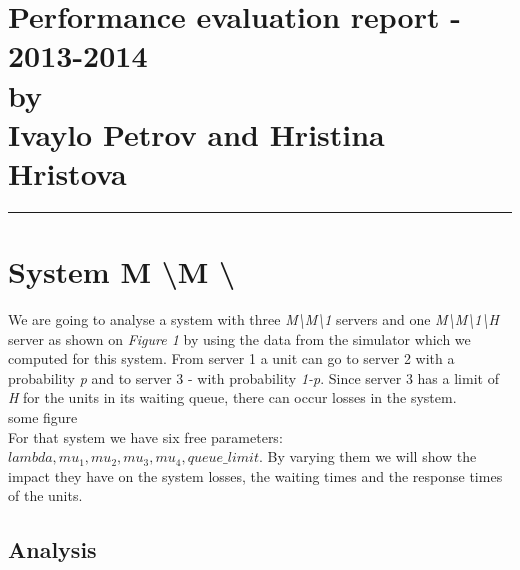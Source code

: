 \documentclass[12pt]{article}
\newcommand{\hr}{\rule{\linewidth}{0.1mm}}
\theoremstyle{plain}
\begin{document}
\section*{\centering
  Performance evaluation report - 2013-2014 \\
  by\\
  Ivaylo Petrov and Hristina Hristova 
}

\hr
\section{\textbf{System M \textbackslash M \textbackslash *}}

We are going to analyse a system with three \emph{M\textbackslash M\textbackslash 1}
servers and one \emph{M\textbackslash M\textbackslash 1\textbackslash H} server
as shown on \emph{Figure 1} by using the data from the simulator which we computed
for this system. From server 1 a unit can go to server 2 with a probability
\emph{p} and to server 3 - with probability \emph{1-p}. Since server 3 has a
limit of \emph{H} for the units in its waiting queue, there can occur losses
in the system.\\
some figure \\
For that system we have six free parameters: $lambda, mu_1, mu_2, mu_3, mu_4,
queue\_limit$. By varying them we will show the impact they have on the system
losses, the waiting times and the response times of the units.

\subsection*{Analysis}
\end{document}
